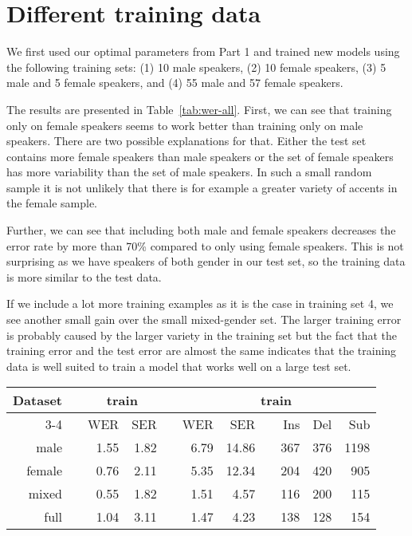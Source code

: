 \documentclass[twocolumn, 11pt]{article}
\begin{document}
\section{Different training data}

We first used our optimal parameters from Part 1 and trained new models using
the following training sets:  (1) 10 male speakers, (2)  10 female speakers, (3) 5 male and 5 female speakers, and (4) 55 male and 57 female speakers.

The results are presented in Table~\ref{tab:wer-all}\@. First, we can see that training only
on female speakers seems to work better than training only on male speakers.
There are two possible explanations for that. Either the test set contains
more female speakers than male speakers or the set of female speakers has more
variability than the set of male speakers. In such a small random sample it is
not unlikely that there is for example a greater variety of accents in the
female sample.

Further, we can see that including both male and female speakers decreases the
error rate by more than 70\% compared to only using female speakers. This is not
surprising as we have speakers of both gender in our test set, so the training
data is more similar to the test data.

If we include a lot more training examples as it is the case in training set 4,
we see another small gain over the small mixed-gender set. The larger training
error is probably caused by the larger variety in the training set but the fact
that the training error and the test error are almost the same indicates that
the training data is well suited to train a model that works well on a large
test set.

\begin{table*}\centering
  \begin{tabular}{@{}rcrrcrrcrrr@{}}\toprule%
    \multirow{2}{*}{Dataset} & \phantom{a} & \multicolumn{2}{c}{train}
    & \phantom{a} & \multicolumn{6}{c}{train} \\
    \cmidrule{3-4} \cmidrule{6-11}
    && WER & SER && WER & SER && Ins & Del & Sub\\ \midrule%
    male && 1.55 & 1.82 && 6.79 & 14.86 && 367 & 376 & 1198\\
    female && 0.76 & 2.11 && 5.35 & 12.34 && 204 & 420 & 905\\
    mixed && 0.55 & 1.82 && 1.51 & 4.57 && 116 & 200 & 115\\
    full && 1.04 & 3.11 && 1.47 & 4.23 && 138 & 128 & 154\\
    \bottomrule
  \end{tabular}
  \caption{Error rates for all datasets}\label{tab:wer-all}
\end{table*}
\end{document}
